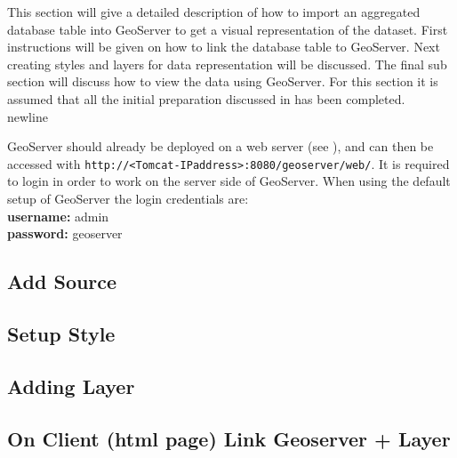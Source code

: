 This section will give a detailed description of how to import an aggregated database table into GeoServer to get a visual representation of the dataset. First instructions will be given on how to link the database table to GeoServer. Next creating styles and layers for data representation will be discussed. The final sub section will discuss how to view the data using GeoServer.  For this section it is assumed that all the initial preparation discussed in  has been completed.\\newline

GeoServer should already be deployed on a web server (see ), and can then be accessed with \lstinline|http://<Tomcat-IPaddress>:8080/geoserver/web/|. It is required to login in order to work on the server side of GeoServer. When using the default setup of GeoServer the login credentials are: \\
\indent \textbf{username:} admin \\
\indent \textbf{password:} geoserver

\subsection{Add Source}


\subsection{Setup Style}


\subsection{Adding Layer}


\subsection{On Client (html page) Link Geoserver + Layer}

